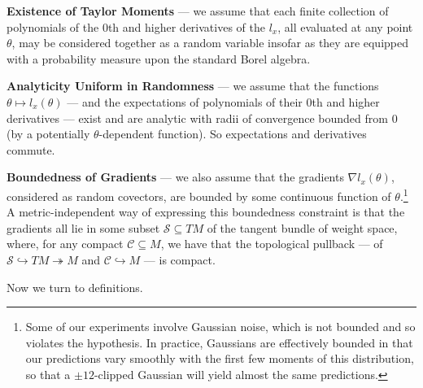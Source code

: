 \documentclass[anon,12pt]{colt2021} %
\newcommand{\Cc}{\mathcal{C}}   \newcommand{\CC}{\mathbb{C}}
\newcommand{\Ss}{\mathcal{S}}
\begin{document}
{        \textbf{Existence of Taylor Moments} --- we assume
        that each finite collection of polynomials of the $0$th and higher
        derivatives of the $l_x$, all evaluated at any point $\theta$, may be
        considered together as a random variable insofar as they are equipped
        with a probability measure upon the standard Borel algebra.

        \textbf{Analyticity Uniform in Randomness} --- we assume that
        the functions $\theta \mapsto l_x(\theta)$ --- and the expectations
        of polynomials of their $0$th and higher derivatives --- exist and are
        analytic with radii of convergence bounded from $0$ (by a potentially
        $\theta$-dependent function).  So expectations and derivatives commute. 

        \textbf{Boundedness of Gradients} --- we also assume that the gradients
        $\nabla l_x(\theta)$, considered as random covectors, are bounded by
        some continuous function of $\theta$.\footnote{
            Some of our experiments involve Gaussian noise, which is not
            bounded and so violates the hypothesis.  In practice, Gaussians are
            effectively bounded
            in that
            our predictions vary smoothly with the first few moments of this
            distribution, so that a $\pm 12$-clipped Gaussian will yield almost
            the same predictions.
        }
        A metric-independent way of expressing this boundedness constraint
        is that the gradients all lie in some subset $\Ss \subseteq TM$ of
        the tangent bundle of weight space, where, for any compact $\Cc
        \subseteq M$, we have that the topological pullback --- of
        $\Ss \hookrightarrow TM \twoheadrightarrow M$
        and
        $\Cc \hookrightarrow M$ ---
        is compact.
        
        Now we turn to definitions.

}
\end{document}
